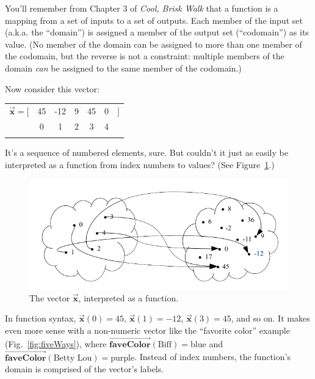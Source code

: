 You'll remember from Chapter 3 of \textit{Cool, Brisk Walk} that a function is
a mapping from a set of inputs to a set of outputs. Each member of the input
set (a.k.a. the ``domain'') is assigned a member of the output set
(``codomain'') as its value. (No member of the domain can be assigned to more
than one member of the codomain, but the reverse is not a constraint: multiple
members of the domain \textit{can} be assigned to the same member of the
codomain.)

Now consider this vector:

\begin{center}
\begin{tabular}{ccccccc}
$\overrightarrow{\textbf{x}} = [$ & 45 & -12 & 9 & 45 & 0 & $]$ \\
& \scriptsize{0} & \scriptsize{1} & \scriptsize{2} & \scriptsize{3} & \scriptsize{4}& \\
\normalsize
\end{tabular}
\end{center}
\vspace{-.15in}

It's a sequence of numbered elements, sure. But couldn't it just as easily be
interpreted as a function from index numbers to values? (See
Figure~\ref{vectorFunction1}.)

\begin{figure}[ht]
\centering
\includegraphics[width=1\textwidth]{vectorFunction1.png}
\caption[.]{The vector $\overrightarrow{\textbf{x}}$, interpreted as a function.}
\label{vectorFunction1}
\end{figure}

In function syntax, $\overrightarrow{\textbf{x}}(0) = 45$,
$\overrightarrow{\textbf{x}}(1) = -12$, $\overrightarrow{\textbf{x}}(3) = 45$,
and so on. It makes even more sense with a non-numeric vector like the
``favorite color'' example (Fig.~\ref{fig:fiveWays}), where
$\overrightarrow{\textbf{faveColor}}(\textrm{Biff}) = \textrm{blue}$ and
$\overrightarrow{\textbf{faveColor}}(\textrm{Betty Lou}) = \textrm{purple}$.
Instead of index numbers, the function's domain is comprised of the vector's
labels.

